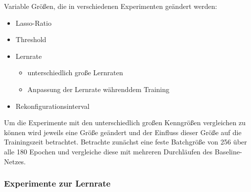 Variable Größen, die in verschiedenen Experimenten geändert werden:

\begin{itemize}
 \item Lasso-Ratio
 \item Threshold
 \item Lernrate
 \begin{itemize}
  \item unterschiedlich große Lernraten
  \item Anpassung der Lernrate währenddem Training
 \end{itemize}
 \item Rekonfigurationsinterval
\end{itemize}

Um die Experimente mit den unterschiedlich großen Kenngrößen vergleichen zu können wird jeweils eine Größe geändert und der Einfluss dieser Größe auf die Trainingszeit betrachtet. Betrachte zunächst eine feste Batchgröße von 256 über alle 180 Epochen und vergleiche diese mit mehreren Durchläufen des Baseline-Netzes. 
\subsubsection{Experimente zur Lernrate}

